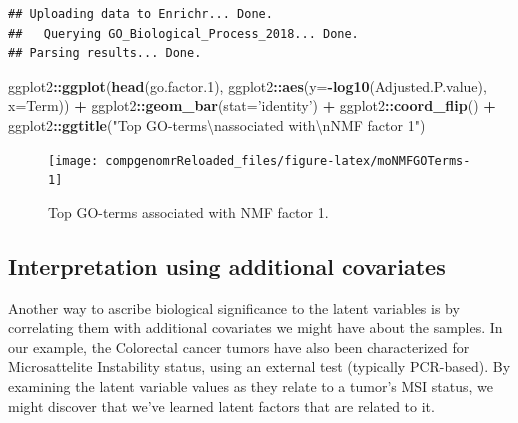 \documentclass[12pt,]{krantz}
\newenvironment{Shaded}{\begin{snugshade}}{\end{snugshade}}
\newcommand{\CharTok}[1]{\textcolor[rgb]{0.31,0.60,0.02}{#1}}
\newcommand{\DataTypeTok}[1]{\textcolor[rgb]{0.13,0.29,0.53}{#1}}
\newcommand{\FloatTok}[1]{\textcolor[rgb]{0.00,0.00,0.81}{#1}}
\newcommand{\KeywordTok}[1]{\textcolor[rgb]{0.13,0.29,0.53}{\textbf{#1}}}
\newcommand{\NormalTok}[1]{#1}
\newcommand{\OperatorTok}[1]{\textcolor[rgb]{0.81,0.36,0.00}{\textbf{#1}}}
\newcommand{\StringTok}[1]{\textcolor[rgb]{0.31,0.60,0.02}{#1}}
\begin{document}
\begin{verbatim}
## Uploading data to Enrichr... Done.
##   Querying GO_Biological_Process_2018... Done.
## Parsing results... Done.
\end{verbatim}

\begin{Shaded}
\begin{Highlighting}[]
\NormalTok{ggplot2}\OperatorTok{::}\KeywordTok{ggplot}\NormalTok{(}\KeywordTok{head}\NormalTok{(go.factor}\FloatTok{.1}\NormalTok{), ggplot2}\OperatorTok{::}\KeywordTok{aes}\NormalTok{(}\DataTypeTok{y=}\OperatorTok{-}\KeywordTok{log10}\NormalTok{(Adjusted.P.value), }\DataTypeTok{x=}\NormalTok{Term)) }\OperatorTok{+}\StringTok{ }\NormalTok{ggplot2}\OperatorTok{::}\KeywordTok{geom_bar}\NormalTok{(}\DataTypeTok{stat=}\StringTok{'identity'}\NormalTok{) }\OperatorTok{+}\StringTok{ }\NormalTok{ggplot2}\OperatorTok{::}\KeywordTok{coord_flip}\NormalTok{() }\OperatorTok{+}\StringTok{ }\NormalTok{ggplot2}\OperatorTok{::}\KeywordTok{ggtitle}\NormalTok{(}\StringTok{"Top GO-terms}\CharTok{\textbackslash{}n}\StringTok{associated with}\CharTok{\textbackslash{}n}\StringTok{NMF factor 1"}\NormalTok{)}
\end{Highlighting}
\end{Shaded}

\begin{figure}

{\centering \texttt{[image: compgenomrReloaded\_files/figure-latex/moNMFGOTerms-1]} 

}

\caption{Top GO-terms associated with NMF factor 1.}\label{fig:moNMFGOTerms}
\end{figure}

\hypertarget{interpretation-using-additional-covariates}{%
\subsection{Interpretation using additional covariates}\label{interpretation-using-additional-covariates}}

Another way to ascribe biological significance to the latent variables is by correlating them with additional covariates we might have about the samples. In our example, the Colorectal cancer tumors have also been characterized for Microsattelite Instability status, using an external test (typically PCR-based). By examining the latent variable values as they relate to a tumor's MSI status, we might discover that we've learned latent factors that are related to it.
\end{document}
